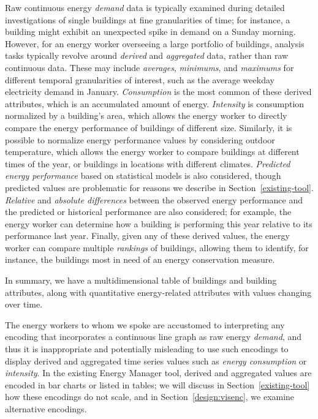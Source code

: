 \documentclass[journal]{vgtc}                %
\newcommand{\bstart}[1]{\vspace{1mm} \noindent{\textbf{#1:}}}
\newcommand{\jn}[1]{\textcolor{darkGreen}{#1}}
\begin{document}
\bstart{Derived data} Raw continuous energy {\it demand} data is typically examined during detailed investigations of single buildings at fine granularities of time; for instance, a building might exhibit an unexpected spike in demand on a Sunday morning. 
However, for an energy worker overseeing a large portfolio of buildings, analysis tasks typically revolve around {\it derived} and {\it aggregated} data, rather than raw continuous data. 
These may include {\it averages}, {\it minimums}, and {\it maximums} for different temporal granularities of interest, such as the average weekday electricity demand in January.
{\it Consumption} is the most common of these derived attributes, which is an accumulated amount of energy.
{\it Intensity} is consumption normalized by a building's area, which allows the energy worker to directly compare the energy performance of buildings of different size.
Similarly, it is possible to normalize energy performance values by considering outdoor temperature, which allows the energy worker to compare buildings at different times of the year, or buildings in locations with different climates.
{\it Predicted energy performance} based on statistical models is also considered, though predicted values are problematic for reasons we describe in Section~\ref{existing-tool}.
{\it Relative} and {\it absolute differences} between the observed energy performance and the predicted or historical performance are also considered; for example, the energy worker can determine how a building is performing this year relative to its performance last year.
Finally, given any of these derived values, the energy worker can compare multiple {\it rankings} of buildings, allowing them to identify, for instance, the buildings most in need of an energy conservation measure.

In summary, we have a multidimensional table of buildings and building attributes, along with quantitative energy-related attributes with values changing over time.

\bstart{Domain convention} The energy workers to whom we spoke are accustomed to interpreting any encoding that incorporates a continuous line graph as raw energy {\it demand}, and thus it is inappropriate and potentially misleading to use such encodings to display derived and aggregated time series values such as {\it energy consumption} or {\it intensity}.
In the existing Energy Manager tool, derived and aggregated values are encoded in bar charts or listed in tables; we will discuss in Section~\ref{existing-tool} how these encodings do not scale, and in Section~\ref{design:visenc}, we examine alternative encodings.
\end{document}

